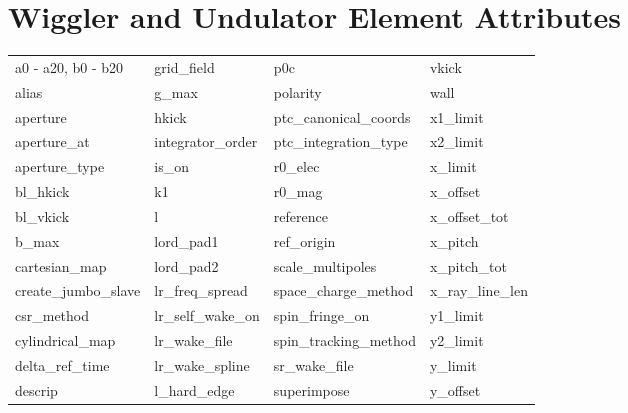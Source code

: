  \section{Wiggler and Undulator Element Attributes}
 \label{s:list.wiggler}
 
 \begin{tabular}{llll} \toprule
a0 - a20, b0 - b20          & grid_field                  & p0c                         & vkick                       \\
alias                       & g_max                       & polarity                    & wall                        \\
aperture                    & hkick                       & ptc_canonical_coords        & x1_limit                    \\
aperture_at                 & integrator_order            & ptc_integration_type        & x2_limit                    \\
aperture_type               & is_on                       & r0_elec                     & x_limit                     \\
bl_hkick                    & k1                          & r0_mag                      & x_offset                    \\
bl_vkick                    & l                           & reference                   & x_offset_tot                \\
b_max                       & lord_pad1                   & ref_origin                  & x_pitch                     \\
cartesian_map               & lord_pad2                   & scale_multipoles            & x_pitch_tot                 \\
create_jumbo_slave          & lr_freq_spread              & space_charge_method         & x_ray_line_len              \\
csr_method                  & lr_self_wake_on             & spin_fringe_on              & y1_limit                    \\
cylindrical_map             & lr_wake_file                & spin_tracking_method        & y2_limit                    \\
delta_ref_time              & lr_wake_spline              & sr_wake_file                & y_limit                     \\
descrip                     & l_hard_edge                 & superimpose                 & y_offset                    \\

\end{tabular}

